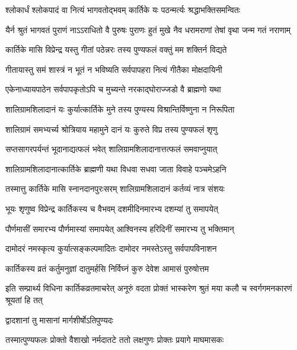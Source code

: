\twolineshloka
{श्लोकार्धं श्लोकपादं वा नित्यं भागवतोद्भवम्}
{कार्तिके यः पठन्मर्त्यः श्रद्धाभक्तिसमन्वितः} %

\fourlineindentedshloka
{यैर्न श्रुतं भागवतं पुराणं}
{नाऽऽराधितो वै पुरुषः पुराणः}
{हुतं मुखे नैव धरामराणां}
{तेषां वृथा जन्म गतं नराणाम्} %

\twolineshloka
{कार्तिके मासि विप्रेन्द्र यस्तु गीतां पठेन्नरः}
{तस्य पुण्यफलं वक्तुं मम शक्तिर्न विद्यते} %

\twolineshloka
{गीतायास्तु समं शास्त्रं न भूतं न भविष्यति}
{सर्वपापहरा नित्यं गीतैका मोक्षदायिनी} %

\twolineshloka
{एकेनाध्यायपाठेन सर्वपापकृतोऽपि च}
{मुच्यन्ते नरकाद्घोराज्जडो वै ब्राह्मणो यथा} %

\twolineshloka
{शालिग्रामशिलादानं यः कुर्यात्कार्तिके मुने}
{तस्य पुण्यस्य विश्रान्तिर्विष्णुना न निरूपिता} %

\twolineshloka
{शालिग्रामं समभ्यर्च्य श्रोत्रियाय महामुने}
{दानं यः कुरुते विप्र तस्य पुण्यफलं शृणु} %

\twolineshloka
{सप्तसागरपर्यन्तं भूदानाद्यत्फलं भवेत्}
{शालिग्रामशिलादानात्तत्फलं समवाप्नुयात्} %

\twolineshloka
{शालिग्रामशिलादानात्कार्तिके ब्राह्मणी यथा}
{विधवा सधवा जाता विवाहे पञ्चमेऽहनि} %

\twolineshloka
{तस्मात्तु कार्तिके मासि स्नानदानपुरःसरम्}
{शालिग्रामशिलादानं कर्तव्यं नात्र संशयः} %





\twolineshloka
{भूयः शृणुष्व विप्रेन्द्र कार्तिकस्य च वैभवम्}
{दशमीदिनमारभ्य दशम्यां तु समापयेत्} %

\twolineshloka
{पौर्णमासीं समारभ्य पौर्णमास्यां समापयेत्}
{आश्विनस्य हरिदिनीं समारभ्य तु भक्तिमान्} %

\twolineshloka
{दामोदरं नमस्कृत्य कुर्यात्सङ्कल्पमादितः}
{दामोदर नमस्तेऽस्तु सर्वपापविनाशन} %

\twolineshloka
{कार्तिकस्य व्रतं कर्तुमनुज्ञां दातुमर्हसि}
{निर्विघ्नं कुरु देवेश आमासं पुरुषोत्तम} %

\threelineshloka
{इति सम्प्रार्थ्य विधिना कार्तिकव्रतमाचरेत्}
{अनूरुं वदता प्रोक्तं भास्करेण श्रुतं मया}
{कलौ च स्वर्गगमनकारणं श्रूयतां हि तत्} %



\onelineshloka
{द्वादशानां तु मासानां मार्गशीर्षोऽतिपुण्यदः} %

\twolineshloka
{तस्मात्पुण्यफलः प्रोक्तो वैशाखो नर्मदातटे}
{ततो लक्षगुणः प्रोक्तः प्रयागे माघमासकः} %


